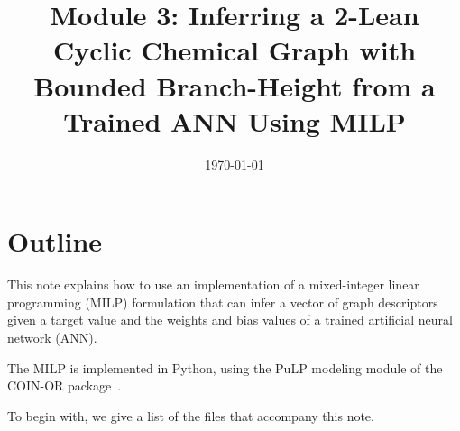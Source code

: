 \documentclass[11pt, titlepage, dvipdfmx, twoside]{article}
\title{\Huge{Module 3: Inferring a 2-Lean Cyclic Chemical Graph with Bounded Branch-Height
			  from a Trained ANN Using MILP}}
\begin{document}
\makeatletter 
\let\c@lstlisting\c@figure
\makeatother

\date{\today}

\maketitle


\thispagestyle{empty}
\tableofcontents
\clearpage



\section{Outline}
\label{sec:Intro}

This note explains how to use an implementation of a mixed-integer
linear programming (MILP) formulation that can infer
a vector of graph descriptors given a target value and the 
weights and bias values of a trained artificial neural network (ANN).

The MILP is implemented in Python, 
using the PuLP modeling module of the 
COIN-OR package~\cite{PuLP1,PuLP2,PuLP3,PuLP4}.

To begin with, we give a list of the files that accompany this note.
\end{document}

